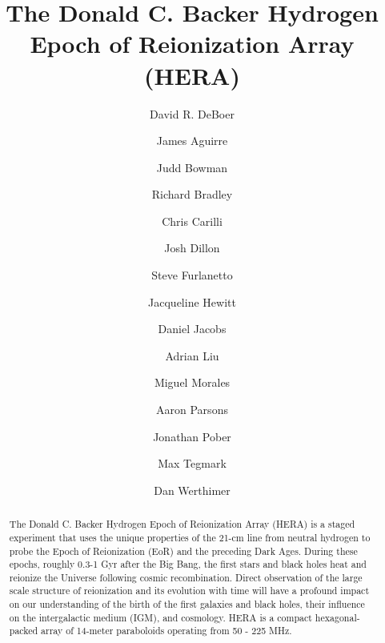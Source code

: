 \documentclass[ars]{/Users/daviddeboer1/Documents/Papers/Copernicus_LaTeX_Package_v_2_7/copernicus}
\begin{document}
\linenumbers

\title{The Donald C. Backer Hydrogen Epoch of Reionization Array (HERA)}

\author[1]{David R. DeBoer}
\author[2]{James Aguirre}
\author[3]{Judd Bowman}
\author[4]{Richard Bradley}
\author[4]{Chris Carilli}
\author[5]{Josh Dillon}
\author[6]{Steve Furlanetto}
\author[5]{Jacqueline Hewitt}
\author[3]{Daniel Jacobs}
\author[1]{Adrian Liu}
\author[7]{Miguel Morales}
\author[1]{Aaron Parsons}
\author[7]{Jonathan Pober}
\author[5]{Max Tegmark}
\author[1]{Dan Werthimer}






\received{}
\pubdiscuss{} %
\revised{}
\accepted{}
\published{}




\maketitle 

\begin{abstract}
The Donald C. Backer Hydrogen Epoch of Reionization Array (HERA) is a staged
experiment that uses the unique properties of the 21-cm line from neutral
hydrogen to probe the Epoch of Reionization (EoR) and the preceding Dark
Ages. During these epochs, roughly 0.3-1 Gyr after the Big Bang, the first
stars and black holes heat and reionize the Universe following cosmic
recombination. Direct observation of the large scale structure of
reionization and its evolution with time will have
a profound impact on our understanding of the birth of the first galaxies
and black holes, their influence on the intergalactic medium (IGM), and
cosmology.  HERA is a compact hexagonal-packed array of 14-meter paraboloids 
operating from 50 - 225 MHz.
\end{abstract}
\end{document}
